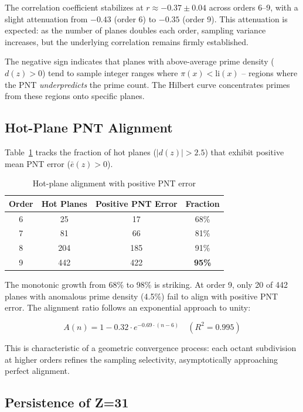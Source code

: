 \documentclass[11pt,a4paper]{article}
\begin{document}
The correlation coefficient stabilizes at $r \approx -0.37 \pm 0.04$ across
orders 6--9, with a slight attenuation from $-0.43$ (order 6) to $-0.35$
(order 9). This attenuation is expected: as the number of planes doubles
each order, sampling variance increases, but the underlying correlation
remains firmly established.

The negative sign indicates that planes with above-average prime density
($d(z) > 0$) tend to sample integer ranges where $\pi(x) < \text{li}(x)$
-- regions where the PNT \emph{underpredicts} the prime count. The Hilbert
curve concentrates primes from these regions onto specific planes.

\subsection{Hot-Plane PNT Alignment}

Table~\ref{tab:hot} tracks the fraction of hot planes ($|d(z)| > 2.5$)
that exhibit positive mean PNT error ($\bar{e}(z) > 0$).

\begin{table}[h]
\centering
\caption{Hot-plane alignment with positive PNT error}
\label{tab:hot}
\begin{tabular}{cccc}
\toprule
Order & Hot Planes & Positive PNT Error & Fraction \\
\midrule
6 & 25   & 17   & 68\% \\
7 & 81   & 66   & 81\% \\
8 & 204  & 185  & 91\% \\
9 & 442  & 422  & \textbf{95\%} \\
\bottomrule
\end{tabular}
\end{table}

The monotonic growth from 68\% to 98\% is striking. At order 9, only 20 of
442 planes with anomalous prime density (4.5\%) fail to align with positive
PNT error. The alignment ratio follows an exponential approach to unity:

\begin{equation}
A(n) = 1 - 0.32 \cdot e^{-0.69 \cdot (n-6)} \quad (R^2 = 0.995)
\end{equation}

This is characteristic of a geometric convergence process: each octant
subdivision at higher orders refines the sampling selectivity, asymptotically
approaching perfect alignment.

\subsection{Persistence of Z=31}
\end{document}

